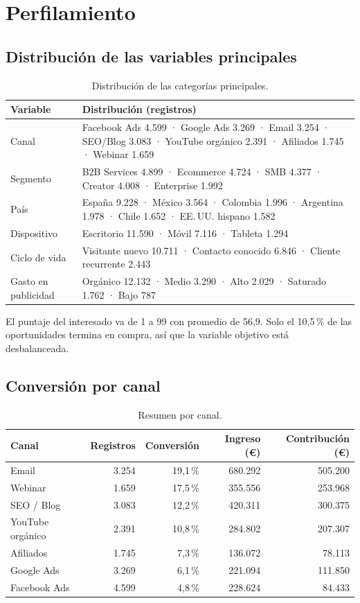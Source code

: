 \documentclass[11pt,letterpaper]{article}
\newcommand{\encabezado}{\rowcolor{mcicCian!15}}
\begin{document}
\section{Perfilamiento}

\subsection{Distribución de las variables principales}

\begin{table}[H]
\centering\small
\caption{Distribución de las categorías principales.}
\begin{tabularx}{\linewidth}{l L}
\toprule
\encabezado Variable & Distribución (registros) \\
\midrule
Canal & Facebook Ads 4.599 · Google Ads 3.269 · Email 3.254 · SEO/Blog 3.083 · YouTube orgánico 2.391 ·
Afiliados 1.745 · Webinar 1.659 \\
Segmento & B2B Services 4.899 · Ecommerce 4.724 · SMB 4.377 · Creator 4.008 · Enterprise 1.992 \\
País & España 9.228 · México 3.564 · Colombia 1.996 · Argentina 1.978 · Chile 1.652 · EE.\,UU. hispano 1.582 \\
Dispositivo & Escritorio 11.590 · Móvil 7.116 · Tableta 1.294 \\
Ciclo de vida & Visitante nuevo 10.711 · Contacto conocido 6.846 · Cliente recurrente 2.443 \\
Gasto en publicidad & Orgánico 12.132 · Medio 3.290 · Alto 2.029 · Saturado 1.762 · Bajo 787 \\
\bottomrule
\end{tabularx}
\end{table}

El puntaje del interesado va de 1 a 99 con promedio de 56,9. Solo el 10,5\,\% de las oportunidades termina en
compra, así que la variable objetivo está desbalanceada.

\subsection{Conversión por canal}

\begin{table}[H]
\centering\small
\caption{Resumen por canal.}
\begin{tabular}{lrrrr}
\toprule
\encabezado Canal & Registros & Conversión & Ingreso (€) & Contribución (€) \\
\midrule
Email & 3.254 & 19,1\,\% & 680.292 & 505.200 \\
Webinar & 1.659 & 17,5\,\% & 355.556 & 253.968 \\
SEO / Blog & 3.083 & 12,2\,\% & 420.311 & 300.375 \\
YouTube orgánico & 2.391 & 10,8\,\% & 284.802 & 207.307 \\
Afiliados & 1.745 & 7,3\,\% & 136.072 & 78.113 \\
Google Ads & 3.269 & 6,1\,\% & 221.094 & 111.850 \\
Facebook Ads & 4.599 & 4,8\,\% & 228.624 & 84.433 \\
\bottomrule
\end{tabular}
\end{table}
\end{document}
